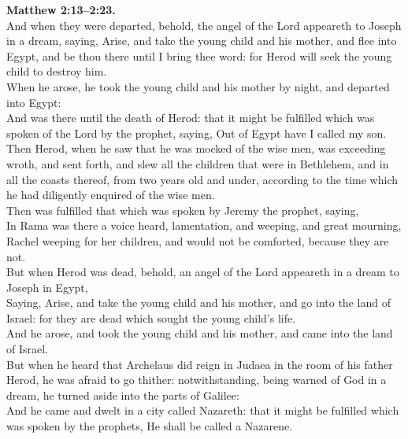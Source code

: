 \documentclass[10pt]{article} %
\begin{document}
{\begin{minipage}[t]{0.45\textwidth}
\textbf{Matthew 2:13--2:23.}\\
And when they were departed, behold, the angel of the Lord appeareth to Joseph in a dream, saying, Arise, and take the young child and his mother, and flee into Egypt, and be thou there until I bring thee word: for Herod will seek the young child to destroy him.\\
When he arose, he took the young child and his mother by night, and departed into Egypt:\\
And was there until the death of Herod: that it might be fulfilled which was spoken of the Lord by the prophet, saying, Out of Egypt have I called my son.\\
Then Herod, when he saw that he was mocked of the wise men, was exceeding wroth, and sent forth, and slew all the children that were in Bethlehem, and in all the coasts thereof, from two years old and under, according to the time which he had diligently enquired of the wise men.\\
Then was fulfilled that which was spoken by Jeremy the prophet, saying,\\
In Rama was there a voice heard, lamentation, and weeping, and great mourning, Rachel weeping for her children, and would not be comforted, because they are not.\\
But when Herod was dead, behold, an angel of the Lord appeareth in a dream to Joseph in Egypt,\\
Saying, Arise, and take the young child and his mother, and go into the land of Israel: for they are dead which sought the young child's life.\\
And he arose, and took the young child and his mother, and came into the land of Israel.\\
But when he heard that Archelaus did reign in Judaea in the room of his father Herod, he was afraid to go thither: notwithstanding, being warned of God in a dream, he turned aside into the parts of Galilee:\\
And he came and dwelt in a city called Nazareth: that it might be fulfilled which was spoken by the prophets, He shall be called a Nazarene.\\

\end{minipage}}
\vspace*{\fill}
\newpage
\huge%
\vspace*{\fill}
\end{document}
